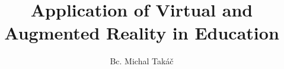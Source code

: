 \documentclass[]{tukethesis}
\author{Bc. Michal Takáč}
\title{Application of Virtual and Augmented Reality in Education}
\subtitle{}
\begin{document}
\renewcommand\theHfigure{\theHsection.\arabic{figure}}
\renewcommand\theHtable{\theHsection.\arabic{table}}

\firstpage

\titlepage


%
%

\abstrakte %
\newpage
\abstrakt %

\endabstract %

\end{document}
